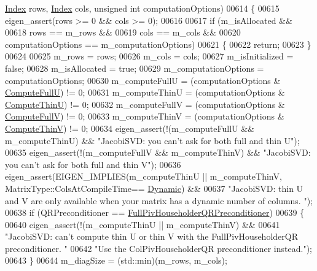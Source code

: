 \begin{DoxyCode}
      \hyperlink{group___s_v_d___module_a6229a37997eca1072b52cca5ee7a2bec}{Index} rows, \hyperlink{group___s_v_d___module_a6229a37997eca1072b52cca5ee7a2bec}{Index} cols, \textcolor{keywordtype}{unsigned} \textcolor{keywordtype}{int} computationOptions)
00614 \{
00615   eigen\_assert(rows >= 0 && cols >= 0);
00616 
00617   \textcolor{keywordflow}{if} (m\_isAllocated &&
00618       rows == m\_rows &&
00619       cols == m\_cols &&
00620       computationOptions == m\_computationOptions)
00621   \{
00622     \textcolor{keywordflow}{return};
00623   \}
00624 
00625   m\_rows = rows;
00626   m\_cols = cols;
00627   m\_isInitialized = \textcolor{keyword}{false};
00628   m\_isAllocated = \textcolor{keyword}{true};
00629   m\_computationOptions = computationOptions;
00630   m\_computeFullU = (computationOptions & \hyperlink{group__enums_ggae3e239fb70022eb8747994cf5d68b4a9a2b4f91ca5859a4159dbfe8090043817f}{ComputeFullU}) != 0;
00631   m\_computeThinU = (computationOptions & \hyperlink{group__enums_ggae3e239fb70022eb8747994cf5d68b4a9af8c742a1aa87773e165eae406c9ccaf8}{ComputeThinU}) != 0;
00632   m\_computeFullV = (computationOptions & \hyperlink{group__enums_ggae3e239fb70022eb8747994cf5d68b4a9a52c6f7e80bbf9a42297c88f700245b51}{ComputeFullV}) != 0;
00633   m\_computeThinV = (computationOptions & \hyperlink{group__enums_ggae3e239fb70022eb8747994cf5d68b4a9a1055e53fa95c8ae04a07ebb72cfafd95}{ComputeThinV}) != 0;
00634   eigen\_assert(!(m\_computeFullU && m\_computeThinU) && \textcolor{stringliteral}{"JacobiSVD: you can't ask for both full and thin U"});
00635   eigen\_assert(!(m\_computeFullV && m\_computeThinV) && \textcolor{stringliteral}{"JacobiSVD: you can't ask for both full and thin V"});
00636   eigen\_assert(EIGEN\_IMPLIES(m\_computeThinU || m\_computeThinV, MatrixType::ColsAtCompileTime==
      \hyperlink{namespace_eigen_ad81fa7195215a0ce30017dfac309f0b2}{Dynamic}) &&
00637               \textcolor{stringliteral}{"JacobiSVD: thin U and V are only available when your matrix has a dynamic number of columns.
      "});
00638   \textcolor{keywordflow}{if} (QRPreconditioner == \hyperlink{group__enums_gga46eba0d5c621f590b8cf1b53af31d56ea566c44ba828dea7f5d2fb174d799d5d2}{FullPivHouseholderQRPreconditioner})
00639   \{
00640       eigen\_assert(!(m\_computeThinU || m\_computeThinV) &&
00641               \textcolor{stringliteral}{"JacobiSVD: can't compute thin U or thin V with the FullPivHouseholderQR preconditioner. "}
00642               \textcolor{stringliteral}{"Use the ColPivHouseholderQR preconditioner instead."});
00643   \}
00644   m\_diagSize = (std::min)(m\_rows, m\_cols);

\end{DoxyCode}
